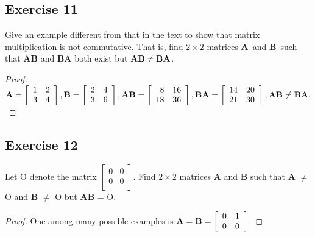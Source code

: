 \documentclass[14pt]{extarticle}
\begin{document}
\subsection{Exercise 11}
Give an example different from that in the text to show that matrix multiplication is not commutative. That is, find 
\(2 \times 2\) matrices {\bf A}\, and {\bf B}\, such that {\bf AB} and {\bf BA} both exist but \({\bf AB} \neq {\bf BA}\).

\begin{proof}
\({\bf A} = 
\left[ 
\begin{array}{rr}
1 & 2 \\
3 & 4 \\
\end{array}
\right], {\bf B} = 
\left[ 
\begin{array}{rr}
2 & 4 \\
3 & 6 \\
\end{array}
\right], {\bf AB} = 
\left[ 
\begin{array}{rr}
8 & 16 \\
18 & 36 \\
\end{array}
\right], {\bf BA} = 
\left[ 
\begin{array}{rr}
14 & 20 \\
21 & 30 \\
\end{array}
\right], {\bf AB} \neq {\bf BA}.
\)
\end{proof}

\subsection{Exercise 12}
Let O denote the matrix 
\(\left[ 
\begin{array}{rr}
0 & 0 \\
0 & 0 \\
\end{array}
\right]
\). Find \(2 \times 2\) matrices {\bf A} and {\bf B} such that {\bf A} \(\neq\) O and {\bf B} \(\neq\) O but {\bf AB} = O.

\begin{proof}
One among many possible examples is 
\({\bf A} = {\bf B} =
\left[ 
\begin{array}{rr}
0 & 1 \\
0 & 0 \\
\end{array}
\right]
\).
\end{proof}
\end{document}
